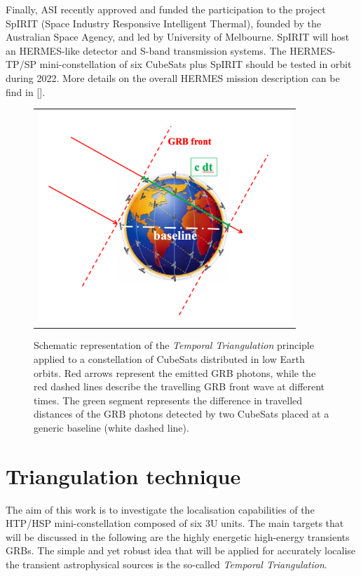 \documentclass[]{spie}  %
\begin{document}
Finally, ASI recently approved and funded the participation to the project SpIRIT (Space Industry Responsive Intelligent Thermal), founded by the Australian Space Agency, and led by University of Melbourne. SpIRIT will host an HERMES-like detector and S-band transmission systems. The HERMES-TP/SP mini-constellation of six CubeSats plus SpIRIT should be tested in orbit during 2022. More details on the overall HERMES mission description can be find in [].


\begin{figure}
\begin{center}
\begin{tabular}{c}
\includegraphics[height=8cm]{triangulation} 
\end{tabular}
\end{center}
\caption[example] 
{ \label{fig:triangulation} 
Schematic representation of the \emph{Temporal Triangulation} principle applied to a constellation of CubeSats distributed in low Earth orbits. Red arrows represent the emitted GRB photons, while the red dashed lines describe the travelling GRB front wave at different times. The green segment represents the difference in travelled distances of the GRB photons detected by two CubeSats placed at a generic baseline (white dashed line).}
\end{figure} 


\section{Triangulation technique}
The aim of this work is to investigate the localisation capabilities of the HTP/HSP mini-constellation composed of six 3U units. The main targets that will be discussed in the following are the highly energetic high-energy transients GRBs. The simple and yet robust idea that will be applied for accurately localise the transient astrophysical sources is the so-called \emph{Temporal Triangulation}.  
\end{document}
